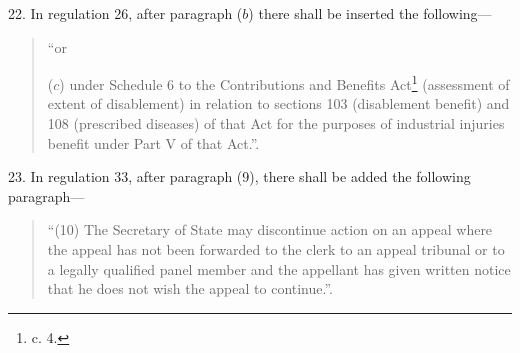 \documentclass[12pt,a4paper]{article}
\begin{document}
22.  In regulation 26, after paragraph ($b$)  there shall be inserted the following—
\begin{quotation}
“or

($c$) under Schedule 6 to the Contributions and Benefits Act\footnote{ c. 4.} (assessment of extent of disablement) in relation to sections 103 (disablement benefit) and 108 (prescribed diseases) of that Act for the purposes of industrial injuries benefit under Part V of that Act.”.
\end{quotation}

\medskip

23.  In regulation 33, after paragraph (9), there shall be added the following paragraph—
\begin{quotation}
“(10) The Secretary of State may discontinue action on an appeal where the appeal has not been forwarded to the clerk to an appeal tribunal or to a legally qualified panel member and the appellant has given written notice that he does not wish the appeal to continue.”.
\end{quotation}

\end{document}

